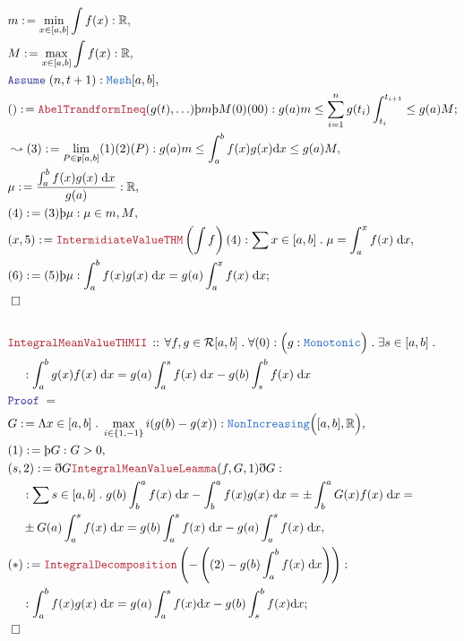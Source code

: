 \documentclass[12pt]{scrartcl}
\newcommand{\TYPE}[1]{\textcolor{NavyBlue}{\mathtt{#1}}}
\newcommand{\LOGIC}[1]{\textcolor{Blue}{\mathtt{#1}}}
\newcommand{\THM}[1]{\textcolor{Maroon}{\mathtt{#1}}}
\renewcommand{\.}{\; . \;}
\newcommand{\de}{: \kern 0.1pc =}
\newcommand{\Theorem}[2]{& \THM{#1} \, :: \, #2 \\ & \Proof = \\ }
\newcommand{\NewLine}{\\ & \kern 1pc}
\newcommand{\Page}[1]{ \begin{align*} #1 \end{align*}   }
\newcommand{ \bd }{ \ByDef }
\newcommand{\Reals}{\mathbb{R} }
\newcommand{\Say}[3]{& #1 \de #2 : #3, \\}
\newcommand{\Conclude}[3]{& #1 \de #2 : #3; \\}
\newcommand{\Derive}[3]{& \leadsto #1 \de #2 : #3, \\}
\newcommand{\Assume}[2]{& \LOGIC{Assume} \;#1 : #2, \\}
\newcommand{\QED}{\; \square}
\newcommand{\EndProof}{& \QED \\}
\newcommand{\ByDef}{\eth}
\newcommand{\ByConstr}{\text{\thorn}}
\newcommand{\Proof}{\LOGIC{Proof} \; }
\begin{document}
\Page{
	\Say{m}{\min_{x \in [a,b]} \int f(x)}{\Reals}
	\Say{M}{\max_{x \in [a,b]} \int f(x)}{\Reals}
	\Assume{(n,t+1)}{\TYPE{Mesh}[a,b]}
	\Conclude{()}{\THM{AbelTrandformIneq}(g(t),\ldots)\ByConstr m \ByConstr M (0)(00)}
	{   g(a)m \le \sum^{n}_{i=1} g(t_i) \int^{t_{i+1}}_{t_i} \le g(a)M         
	}
	\Derive{(3)}{\lim_{P \in \mathfrak{p}[a,b]} (1)(2)(P)}
	{
		g(a)m \le \int^b_a f(x)g(x) \mathrm{d}x \le g(a)M
	}
	\Say{\mu}{\frac{\int^b_a f(x)g(x) \; \mathrm{d}x}{g(a)}}{\Reals}
	\Say{(4)}{(3)\ByConstr \mu}{\mu \in {m,M}}
	\Say{(x,5)}{\THM{IntermidiateValueTHM}\left( \int f \right)(4)}
	{
		\sum x \in [a,b] \. 
			 \mu = \int^x_a f(x) \; \mathrm{d} x
	}
	\Conclude{(6)}{(5)\ByConstr \mu}{\int^b_a f(x)g(x) \; \mathrm{d}x = g(a)\int^x_a f(x) \; \mathrm{d}x}
	\EndProof
	\\
	\Theorem{IntegralMeanValueTHMII}{\forall f,g \in \mathcal{R}[a,b] \. 
		\forall (0) : \Big( g : \TYPE{Monotonic} \Big)  \.   \exists s \in [a,b] \.
		\NewLine :
		\int^b_a g(x)f(x) \; \mathrm{d}x = g(a)\int^s_a f(x) \; \mathrm{d}x - g(b) \int_s^b f(x) \; \mathrm{d}x 
	}
	\Say{G}{\Lambda x \in [a,b] \. \max_{i \in \{1,-1\} }  i(g(b) - g(x)) }
	{ \TYPE{NonIncreasing}\Big([a,b],\Reals \Big)  }
	\Say{(1)}{\ByConstr G}{G > 0}
	\Say{(s,2)}{\bd G\THM{IntegralMeanValueLeamma}(f,G,1)\bd G}
	{ \NewLine :
		\sum s \in [a,b] \. 
		g(b)\int^a_b f(x) \; \mathrm{d}x  - \int^a_b f(x)g(x) \; \mathrm{d}x =
		\pm \int^a_b G(x)f(x) \; \mathrm{d}x = \NewLine
		\pm G(a) \int^s_a f(x) \; \mathrm{d}x =
		g(b) \int^s_a f(x) \; \mathrm{d}x - g(a)\int^s_a f(x) \; \mathrm{d}x 
	}
	\Conclude{(*)}{\THM{IntegralDecomposition}\left(-\left( (2) - g(b)\int^b_a f(x) \; \mathrm{d}x \right) \right)}
	{ 
	\NewLine :
	\int^b_a f(x)g(x) \; \mathrm{d}x = g(a)\int^s_a f(x) \mathrm{d}x - g(b)\int^b_s f(x) \mathrm{d}x    }
	\EndProof
}
\end{document}

